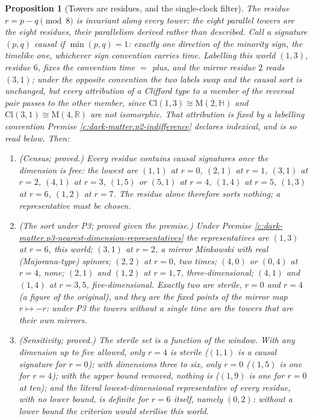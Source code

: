 \documentclass[11pt]{article}
\newtheorem{proposition}[theorem]{Proposition}
\theoremstyle{definition}
\theoremstyle{plain}
\newcommand{\changedmark}[2]{\marginpar{\raggedright\scriptsize\color{#1}#2}}
\providecommand{\Cl}{}\renewcommand{\Cl}{\mathrm{Cl}}
\providecommand{\Mat}{}\renewcommand{\Mat}{\mathrm{M}}
\providecommand{\R}{}\renewcommand{\R}{\mathbb{R}}
\begin{document}
\begin{proposition}[Towers are residues, and the single-clock filter]\label{c:dark-matter.towers-are-residues-single-clock-filter}
\changedmark{gray}{reworded}
The residue $r = p - q \pmod 8$ is invariant along every tower: the eight parallel towers are the eight residues, their parallelism derived rather than described. Call a signature $(p,q)$ \emph{causal} if $\min(p,q) = 1$: exactly one direction of the minority sign, the timelike one, whichever sign convention carries time. Labelling this world $(1,3)$, residue $6$, fixes the convention time $=$ plus, and the mirror residue $2$ reads $(3,1)$; under the opposite convention the two labels swap and the causal sort is unchanged, but every attribution of a Clifford type to a member of the reversal pair passes to the other member, since $\Cl(1,3) \cong \Mat(2,\mathbb{H})$ and $\Cl(3,1) \cong \Mat(4,\R)$ are not isomorphic. That attribution is fixed by a labelling convention Premise \ref{c:dark-matter.p2-indifference} declares indexical, and is so read below. Then:
\begin{enumerate}
\item[(i)] \emph{(Census; proved.)} Every residue contains causal signatures once the dimension is free: the lowest are $(1,1)$ at $r = 0$, $(2,1)$ at $r = 1$, $(3,1)$ at $r = 2$, $(4,1)$ at $r = 3$, $(1,5)$ or $(5,1)$ at $r = 4$, $(1,4)$ at $r = 5$, $(1,3)$ at $r = 6$, $(1,2)$ at $r = 7$. The residue alone therefore sorts nothing; a representative must be chosen.
\item[(ii)] \emph{(The sort under P3; proved given the premise.)} Under Premise \ref{c:dark-matter.p3-nearest-dimension-representatives} the representatives are $(1,3)$ at $r = 6$, this world; $(3,1)$ at $r = 2$, a mirror Minkowski with real (Majorana-type) spinors; $(2,2)$ at $r = 0$, two times; $(4,0)$ or $(0,4)$ at $r = 4$, none; $(2,1)$ and $(1,2)$ at $r = 1, 7$, three-dimensional; $(4,1)$ and $(1,4)$ at $r = 3, 5$, five-dimensional. Exactly two are sterile, $r = 0$ and $r = 4$ (a figure of the original), and they are the fixed points of the mirror map $r \mapsto -r$: under P3 the towers without a single time are the towers that are their own mirrors.
\item[(iii)] \emph{(Sensitivity; proved.)} The sterile set is a function of the window. With any dimension up to five allowed, only $r = 4$ is sterile ($(1,1)$ is a causal signature for $r = 0$); with dimensions three to six, only $r = 0$ ($(1,5)$ is one for $r = 4$); with the upper bound removed, nothing is ($(1,9)$ is one for $r = 0$ at ten); and the literal lowest-dimensional representative of every residue, with no lower bound, is definite for $r = 6$ itself, namely $(0,2)$: without a lower bound the criterion would sterilise this world.

\end{enumerate}
\end{proposition}
\end{document}
